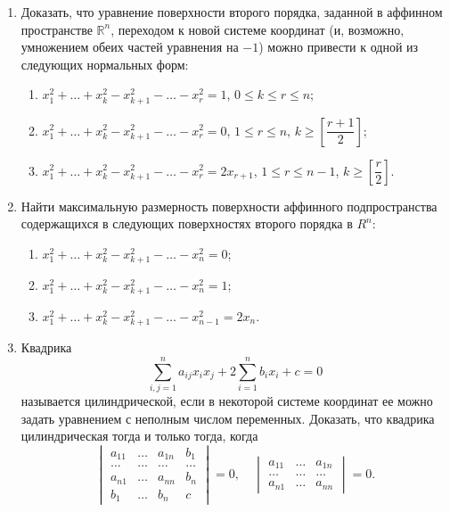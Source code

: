 \begin{enumerate}

	\item Доказать, что уравнение поверхности второго порядка, заданной в аффинном пространстве $\mathbb{R}^n$, переходом к новой системе координат (и, возможно, умножением обеих частей уравнения на $-1$) можно привести к одной из следующих нормальных форм:
	\begin{enumerate}
		\item $x_1^2 + \ldots + x_k^2 - x_{k+1}^2 - \ldots - x_r^2 = 1$, $0 \le k \le r \le n$;
		\item $x_1^2 + \ldots + x_k^2 - x_{k+1}^2 - \ldots - x_r^2 = 0$, $1 \le r \le n$, $k \ge \left[\dfrac{r+1}{2}\right]$;
		\item $x_1^2 + \ldots + x_k^2 - x_{k+1}^2 - \ldots - x_r^2 = 2x_{r + 1}$, $1 \le r \le n - 1$, $k \ge \left[\dfrac{r}{2}\right].$
	\end{enumerate}

	\item Найти максимальную размерность поверхности аффинного подпространства содержащихся в следующих поверхностях второго порядка в $R^n$:
	\begin{enumerate}
		\item $x_1^2 + \ldots + x_k^2 - x_{k+1}^2 - \ldots - x_n^2 = 0$;
		\item $x_1^2 + \ldots + x_k^2 - x_{k+1}^2 - \ldots - x_n^2 = 1$;
		\item $x_1^2 + \ldots + x_k^2 - x_{k+1}^2 - \ldots - x_{n-1}^2 = 2x_n$.
	\end{enumerate}

	\item Квадрика
	\[
		\sum_{i,j=1}^n a_{ij} x_i x_j + 2\sum_{i=1}^n b_i x_i + c = 0
	\]
	называется цилиндрической, если в некоторой системе координат ее можно задать уравнением с неполным числом переменных. Доказать, что квадрика цилиндрическая тогда и только тогда, когда
	\[
		\begin{vmatrix}
			a_{11} & \hdots & a_{1n} & b_1\\
			\hdots & \hdots & \hdots & \hdots\\
			a_{n1} & \hdots & a_{nn} & b_n \\
			b_1 & \hdots & b_n & c 
		\end{vmatrix} = 0,
		\quad
		\begin{vmatrix}
			a_{11} & \hdots & a_{1n} \\
			\hdots & \hdots & \hdots \\
			a_{n1} & \hdots & a_{nn}
		\end{vmatrix} = 0.
	\]


\end{enumerate}
